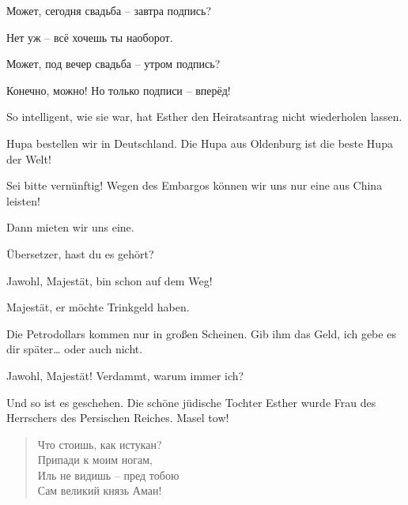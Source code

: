 \documentclass[12pt,a4paper,titlepage]{article}
\begin{document}
\begin{drama}
Может, сегодня свадьба -- завтра подпись?

Нет уж -- всё хочешь ты наоборот.

Может, под вечер свадьба -- утром подпись­­?

Конечно, можно! Но только подписи -- вперёд!

\vspace{3ex}

\uespeaks
So intelligent, wie sie war, hat Esther den Heiratsantrag nicht wiederholen lassen.

\vspace{3ex}

\espeaks {}
Hupa bestellen wir in Deutschland. Die Hupa aus Oldenburg ist die beste Hupa der Welt!

\ahspeaks
Sei bitte vernünftig! Wegen des Embargos können wir uns nur eine aus China leisten!

\espeaks
Dann mieten wir uns eine.

\ahspeaks
Übersetzer, hast du es gehört?

\uespeaks
Jawohl, Majestät, bin schon auf dem Weg!

\scene


\uespeaks
Majestät, er möchte Trinkgeld haben.

\ahspeaks
Die Petrodollars kommen nur in großen Scheinen. Gib ihm das Geld, ich gebe es dir später\ldots
{} oder auch nicht.

\uespeaks
Jawohl, Majestät!  Verdammt, warum immer ich?



\uespeaks
Und so ist es geschehen. Die schöne jüdische Tochter Esther
wurde Frau des Herrschers des Persischen Reiches. Masel tow!


\scene


\amspeaks {}
\begin{verse}
Что стоишь, как истукан?\\
Припади к моим ногам,\\
Иль не видишь -- пред тобою\\
Сам великий князь Аман!\\
\end{verse}


\end{drama}
\end{document}
